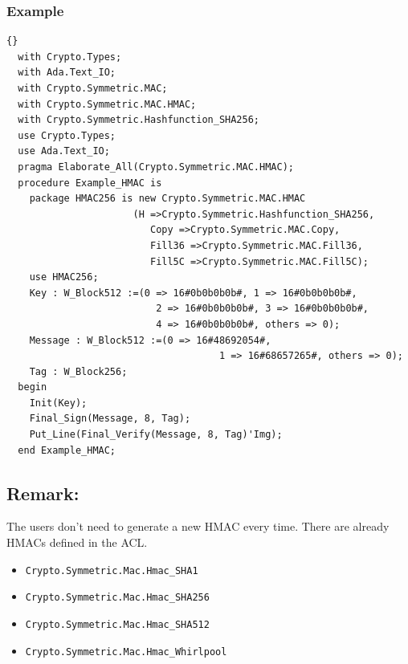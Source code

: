 \subsubsection*{Example}
\begin{lstlisting}{}
  with Crypto.Types;
  with Ada.Text_IO;
  with Crypto.Symmetric.MAC;
  with Crypto.Symmetric.MAC.HMAC;
  with Crypto.Symmetric.Hashfunction_SHA256;
  use Crypto.Types;
  use Ada.Text_IO;
  pragma Elaborate_All(Crypto.Symmetric.MAC.HMAC);
  procedure Example_HMAC is
    package HMAC256 is new Crypto.Symmetric.MAC.HMAC
				      (H =>Crypto.Symmetric.Hashfunction_SHA256,
		    		 	 Copy =>Crypto.Symmetric.MAC.Copy,
						 Fill36 =>Crypto.Symmetric.MAC.Fill36,
						 Fill5C =>Crypto.Symmetric.MAC.Fill5C);
    use HMAC256;
    Key : W_Block512 :=(0 => 16#0b0b0b0b#, 1 => 16#0b0b0b0b#,
		                  2 => 16#0b0b0b0b#, 3 => 16#0b0b0b0b#,
		                  4 => 16#0b0b0b0b#, others => 0);
    Message : W_Block512 :=(0 => 16#48692054#, 
    								 1 => 16#68657265#, others => 0);
    Tag : W_Block256;
  begin
    Init(Key);
    Final_Sign(Message, 8, Tag);
    Put_Line(Final_Verify(Message, 8, Tag)'Img);
  end Example_HMAC;
\end{lstlisting}


\subsection*{Remark:}
The users don't need to generate a new HMAC every time. There are
already HMACs defined in the ACL.
\begin{itemize}
\item \texttt{Crypto.Symmetric.Mac.Hmac\_SHA1}
\item \texttt{Crypto.Symmetric.Mac.Hmac\_SHA256}
\item \texttt{Crypto.Symmetric.Mac.Hmac\_SHA512}
\item \texttt{Crypto.Symmetric.Mac.Hmac\_Whirlpool}
\end{itemize}

